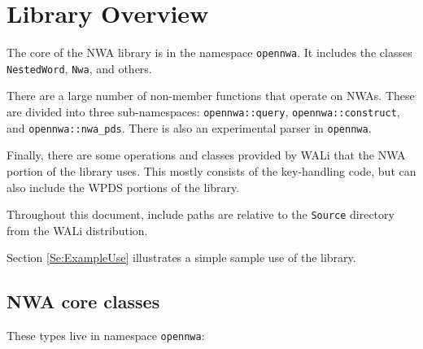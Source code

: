 \clearpage
\tableofcontents

\vspace{2\baselineskip}




\clearpage

\section{Library Overview}
\label{Se:Nested Word Automata}

The core of the NWA library is in the namespace \texttt{opennwa}. It
includes the classes \texttt{NestedWord}, \texttt{Nwa}, and others.

There are a large number of non-member functions that operate on NWAs. These
are divided into three sub-namespaces:
\texttt{opennwa::query}, \texttt{opennwa::construct}, and
\texttt{opennwa::nwa\_pds}. There is also an experimental parser in
\texttt{opennwa}.

Finally, there are some operations and classes provided by WALi that the NWA
portion of the library uses. This mostly consists of the key-handling code,
but can also include the WPDS portions of the library.

Throughout this document, include paths are relative to the \texttt{Source}
directory from the WALi distribution.

Section \ref{Se:ExampleUse} illustrates a simple sample use of the library.

\subsection{NWA core classes}

These types live in namespace \texttt{opennwa}:

